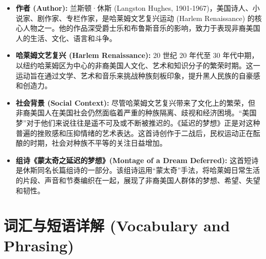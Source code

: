 \documentclass[12pt, a4paper]{article}
\begin{document}
\begin{itemize}
    \item \textbf{作者 (Author):} 兰斯顿·休斯 (Langston Hughes, 1901-1967)，美国诗人、小说家、剧作家、专栏作家，是哈莱姆文艺复兴运动 (Harlem Renaissance) 的核心人物之一。他的作品深受爵士乐和布鲁斯音乐的影响，致力于表现非裔美国人的生活、文化、语言和斗争。
    \item \textbf{哈莱姆文艺复兴 (Harlem Renaissance):} 20 世纪 20 年代至 30 年代中期，以纽约哈莱姆区为中心的非裔美国人文化、艺术和知识分子的繁荣时期。这一运动旨在通过文学、艺术和音乐来挑战种族刻板印象，提升黑人民族的自豪感和创造力。
    \item \textbf{社会背景 (Social Context):} 尽管哈莱姆文艺复兴带来了文化上的繁荣，但非裔美国人在美国社会仍然面临着严重的种族隔离、歧视和经济困境。“美国梦”对于他们来说往往是遥不可及或不断被推迟的。《延迟的梦想》正是对这种普遍的挫败感和压抑情绪的艺术表达。这首诗创作于二战后，民权运动正在酝酿的时期，社会对种族不平等的关注日益增加。
    \item \textbf{组诗《蒙太奇之延迟的梦想》(Montage of a Dream Deferred):} 这首短诗是休斯同名长篇组诗的一部分。该组诗运用“蒙太奇”手法，将哈莱姆日常生活的片段、声音和节奏编织在一起，展现了非裔美国人群体的梦想、希望、失望和韧性。
\end{itemize}

\section{词汇与短语详解 (Vocabulary and Phrasing)}
\end{document}
